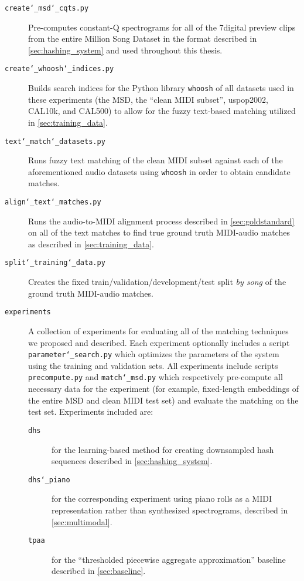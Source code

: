 \begin{description}
\item[\texttt{create\char`_msd\char`_cqts.py}] Pre-computes constant-Q spectrograms for all of the 7digital preview clips \cite{schindler2012facilitating} from the entire Million Song Dataset \cite{bertin2011million} in the format described in \cref{sec:hashing_system} and used throughout this thesis.
\item[\texttt{create\char`_whoosh\char`_indices.py}] Builds search indices for the Python library \texttt{whoosh} of all datasets used in these experiments (the MSD, the ``clean MIDI subset'', uspop2002, CAL10k, and CAL500) to allow for the fuzzy text-based matching utilized in \cref{sec:training_data}.
\item[\texttt{text\char`_match\char`_datasets.py}] Runs fuzzy text matching of the clean MIDI subset against each of the aforementioned audio datasets using \texttt{whoosh} in order to obtain candidate matches.
\item[\texttt{align\char`_text\char`_matches.py}] Runs the audio-to-MIDI alignment process described in \cref{sec:goldstandard} on all of the text matches to find true ground truth MIDI-audio matches as described in \cref{sec:training_data}.
\item[\texttt{split\char`_training\char`_data.py}] Creates the fixed train/validation/development/test split {\em by song} of the ground truth MIDI-audio matches.
\item[\texttt{experiments}] A collection of experiments for evaluating all of the matching techniques we proposed and described.
Each experiment optionally includes a script \texttt{parameter\char`_search.py} which optimizes the parameters of the system using the training and validation sets.
All experiments include scripts \texttt{precompute.py} and \texttt{match\char`_msd.py} which respectively pre-compute all necessary data for the experiment (for example, fixed-length embeddings of the entire MSD and clean MIDI test set) and evaluate the matching on the test set.
Experiments included are:
\begin{description}
\item[\texttt{dhs}] for the learning-based method for creating downsampled hash sequences described in \cref{sec:hashing_system}.
\item[\texttt{dhs\char`_piano}] for the corresponding experiment using piano rolls as a MIDI representation rather than synthesized spectrograms, described in \cref{sec:multimodal}.
\item[\texttt{tpaa}] for the ``thresholded piecewise aggregate approximation'' baseline described in \cref{sec:baseline}.

\end{description}
\end{description}
